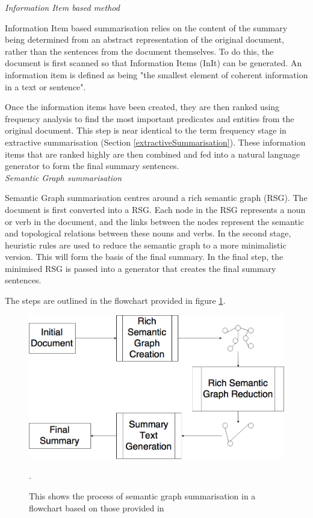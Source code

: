 \documentclass[12pt]{article}
\begin{document}
\emph{Information Item based method}

Information Item based summarisation\cite{informationBasedSummarisation} relies on the content of the summary being determined from an abstract representation of the original document, rather than the sentences from the document themselves. To do this, the document is first scanned so that Information Items (InIt) can be generated. An information item is defined as being "the smallest element of coherent information in a text or sentence". 

Once the information items have been created, they are then ranked using frequency analysis to find the most important predicates and entities from the original document. This step is near identical to the term frequency stage in extractive summarisation (Section \ref{extractiveSummarisation}). These information items that are ranked highly are then combined and fed into a natural language generator to form the final summary sentences. \\

\emph{Semantic Graph summarisation}

Semantic Graph summarisation centres around a rich semantic graph (RSG). The document is first converted into a RSG. Each node in the RSG represents a noun or verb in the document, and the links between the nodes represent the semantic and topological relations between these nouns and verbs. In the second stage, heuristic rules are used to reduce the semantic graph to a more minimalistic version. This will form the basis of the final summary. In the final step, the minimised RSG is passed into a generator that creates the final summary sentences.

The steps are outlined in the flowchart provided in figure \ref{semanticGraphSummarisation}.

\begin{figure}[ht!]
  \centering
    \includegraphics[scale=0.4]{SemanticGraphSummarisation.png}
   \caption[A flowchart showing the process of semantic graph summarisation]{This shows the process of semantic graph summarisation in a flowchart based on those provided in \cite{abstractiveTechniques, abstractiveTechniquesOriginal}}.
   \label{semanticGraphSummarisation}
\end{figure}
\end{document}
